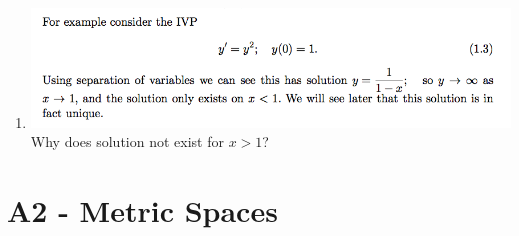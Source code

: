 \documentclass[12pt]{article}
\begin{document}
\begin{enumerate}
\item \includegraphics[width=400pt]{img/question-differential-equations-a1-warning.png}\\
  Why does solution not exist for $x > 1$?
\end{enumerate}

\section{A2 - Metric Spaces}
\end{document}
